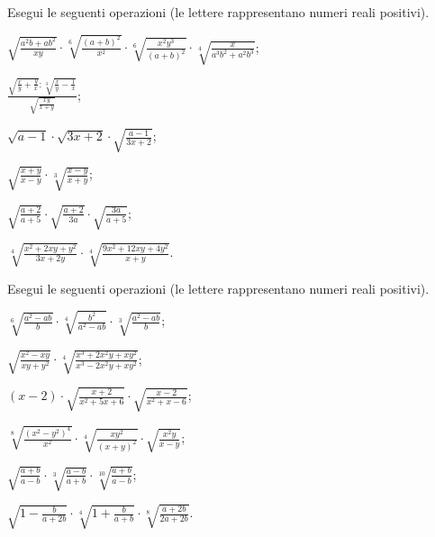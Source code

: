 \begin{esercizio}[\Ast]
 \label{ese:2.43}
Esegui le seguenti operazioni (le lettere rappresentano numeri reali positivi).
 \begin{enumeratea}
 \item $\sqrt{\frac{a^2b+ab^2}{xy}}\cdot \sqrt[6]{\frac{(a+b)^2}{x^2}}\cdot \sqrt[6]{\frac{x^2y^3}{(a+b)^2}}\cdot \sqrt[4]{\frac x{a^3b^2+a^2b^3}}$;
 \item $\frac{\sqrt{\frac x y+\frac y x}:\sqrt[3]{\frac x y-\frac 1 x}}{\sqrt{\frac{xy}{x+y}}}$;
 \item $\sqrt{a-1}\cdot\sqrt{3x+2}\cdot\sqrt{\frac{a-1}{3x+2}}$;
 \item $\sqrt{\frac{x+y}{x-y}}\cdot\sqrt[3]{\frac{x-y}{x+y}}$;
 \item $\sqrt{\frac{a+2}{a+5}}\cdot\sqrt{\frac{a+2}{3a}}\cdot\sqrt{\frac{3a}{a+5}}$;
 \item $\sqrt[4]{\frac{x^2+2xy+y^2}{3x+2y}}\cdot\sqrt[4]{\frac{9x^2+12xy+4y^2}{x+y}}$.
 \end{enumeratea}
\end{esercizio}

\begin{esercizio}[\Ast]
 \label{ese:2.44}
Esegui le seguenti operazioni (le lettere rappresentano numeri reali positivi).
 \begin{enumeratea}
 \item $\sqrt[6]{\frac{a^2-ab}{b}}\cdot\sqrt[4]{\frac{b^2}{a^2-ab}}\cdot\sqrt[3]{\frac{a^2-ab}{b}}$;
 \item $\sqrt{\frac{x^2-xy}{xy+y^2}}\cdot\sqrt[4]{\frac{x^3+2x^2y+xy^2}{x^3-2x^2y+xy^2}}$;
 \item $(x-2)\cdot\sqrt{\frac{x+2}{x^2+5x+6}}\cdot\sqrt{\frac{x-2}{x^2+x-6}}$;
 \item $\sqrt[8]{\frac{(x^2-y^2)^4}{x^2}}\cdot\sqrt[4]{\frac{xy^2}{(x+y)^2}}\cdot\sqrt{\frac{x^2y}{x-y}}$;
 \item $\sqrt{\frac{a+b}{a-b}}\cdot\sqrt[3]{\frac{a-b}{a+b}}\cdot\sqrt[10]{\frac{a+b}{a-b}}$;
 \item $\sqrt{1-\frac{b}{a+2b}}\cdot\sqrt[4]{1+\frac{b}{a+b}}\cdot\sqrt[8]{\frac{a+2b}{2a+2b}}$.
 \end{enumeratea}
\end{esercizio}

